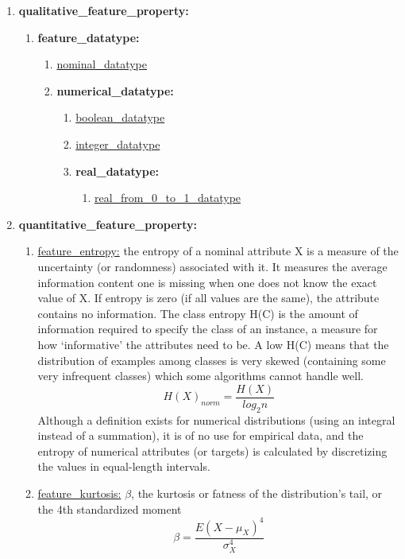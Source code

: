 \documentclass[a4paper,12pt, english]{article}
\begin{document}
\begin{enumerate}
		\begin{enumerate}
		\item \textbf{qualitative\_feature\_property:}
			\begin{enumerate}
			\item \textbf{feature\_datatype:}
				\begin{enumerate}
				\item \underline{nominal\_datatype}
				\item \textbf{numerical\_datatype:}
					\begin{enumerate}
					\item \underline{boolean\_datatype}
					\item \underline{integer\_datatype}
					\item \textbf{real\_datatype:}
						\begin{enumerate}
						\item \underline{real\_from\_0\_to\_1\_datatype}
						\end{enumerate}					
					\end{enumerate}				
				\end{enumerate}			
			\end{enumerate}		
		\item \textbf{quantitative\_feature\_property:}
			\begin{enumerate}
			\item \underline{feature\_entropy:} the entropy of a nominal attribute X is a measure of the uncertainty (or randomness) associated with it. It measures the average information content one is missing when one does not know the exact value of X. If entropy is zero (if all values are the same), the attribute contains no information. The class entropy H(C) is the amount of information required to specify the class of an instance, a measure for how ‘informative’ the attributes need to be. A low H(C) means that the distribution of examples among classes is very skewed (containing some very infrequent classes) which some algorithms cannot handle well. \begin{equation} H(X)_{norm}=\frac{H(X)}{log_{2}n} \end{equation} Although a definition exists for numerical distributions (using an integral instead of a summation), it is of no use for empirical data, and the entropy of numerical attributes (or targets) is calculated by discretizing the values in equal-length intervals.
			\item \underline{feature\_kurtosis:}  $\beta$, the kurtosis or fatness of the distribution's tail, or the 4th standardized moment \begin{equation} \beta=\frac{E(X-\mu_{X})^{4}}{\sigma_{X}^{4}} \end{equation}

\end{enumerate}
\end{enumerate}
\end{enumerate}
\end{document}
